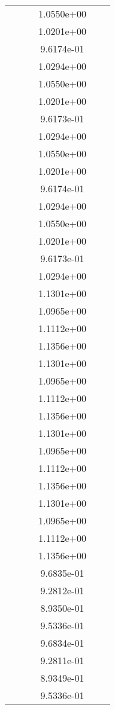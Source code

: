 \begin{xltabular}{\textwidth}{r|rS[table-format=1.3e+2]S[table-format=1.4e+2]S[table-format=1.4e+2]S[table-format=-1.5]}
&  &  & 1.0550e+00 & & \\
&  &  & 1.0201e+00 & & \\
&  &  & 9.6174e-01 & & \\
&  &  & 1.0294e+00 & & \\
&  &  & 1.0550e+00 & & \\
&  &  & 1.0201e+00 & & \\
&  &  & 9.6173e-01 & & \\
&  &  & 1.0294e+00 & & \\
&  &  & 1.0550e+00 & & \\
&  &  & 1.0201e+00 & & \\
&  &  & 9.6174e-01 & & \\
&  &  & 1.0294e+00 & & \\
&  &  & 1.0550e+00 & & \\
&  &  & 1.0201e+00 & & \\
&  &  & 9.6173e-01 & & \\
&  &  & 1.0294e+00 & & \\
&  &  & 1.1301e+00 & & \\
&  &  & 1.0965e+00 & & \\
&  &  & 1.1112e+00 & & \\
&  &  & 1.1356e+00 & & \\
&  &  & 1.1301e+00 & & \\
&  &  & 1.0965e+00 & & \\
&  &  & 1.1112e+00 & & \\
&  &  & 1.1356e+00 & & \\
&  &  & 1.1301e+00 & & \\
&  &  & 1.0965e+00 & & \\
&  &  & 1.1112e+00 & & \\
&  &  & 1.1356e+00 & & \\
&  &  & 1.1301e+00 & & \\
&  &  & 1.0965e+00 & & \\
&  &  & 1.1112e+00 & & \\
&  &  & 1.1356e+00 & & \\
&  &  & 9.6835e-01 & & \\
&  &  & 9.2812e-01 & & \\
&  &  & 8.9350e-01 & & \\
&  &  & 9.5336e-01 & & \\
&  &  & 9.6834e-01 & & \\
&  &  & 9.2811e-01 & & \\
&  &  & 8.9349e-01 & & \\
&  &  & 9.5336e-01 & & \\

\end{xltabular}
